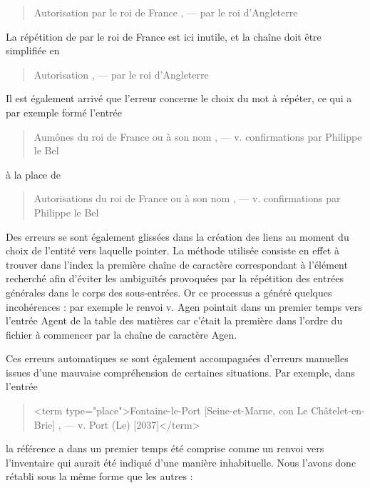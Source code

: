 \documentclass[a4paper,12pt,twoside]{book}
\begin{document}
	\begin{quotation}
		Autorisation par le roi de France , — par le roi d’Angleterre
	\end{quotation}
	
	\noindent La répétition de \og par le roi de France\fg{} est ici inutile, et la chaîne doit être simplifiée en
	
	\begin{quotation}
		Autorisation , — par le roi d’Angleterre
	\end{quotation}

	\noindent Il est également arrivé que l'erreur concerne le choix du mot à répéter, ce qui a par exemple formé l'entrée

	\begin{quotation}
		Aumônes du roi de France ou à son nom , — v. confirmations par Philippe le
	Bel
	\end{quotation}
	
	\noindent à la place de
	
	\begin{quotation}
		Autorisations du roi de France ou à son nom , — v. confirmations par Philippe le	Bel
	\end{quotation}

	Des erreurs se sont également glissées dans la création des liens au moment du choix de l'entité vers laquelle pointer. La méthode utilisée consiste en effet à trouver dans l'index la première chaîne de caractère correspondant à l'élément recherché afin d'éviter les ambiguïtés provoquées par la répétition des entrées générales dans le corps des sous-entrées. Or ce processus a généré quelques incohérences : par exemple le renvoi \og v. Agen\fg{} pointait dans un premier temps vers l'entrée \og Agent\fg{} de la table des matières car c'était la première dans l'ordre du fichier à commencer par la chaîne de caractère \og Agen\fg{}.
	
	Ces erreurs automatiques se sont également accompagnées d'erreurs manuelles issues d'une mauvaise compréhension de certaines situations. Par exemple, dans l'entrée
	
	\begin{quotation}
		<term type="place">Fontaine-le-Port [Seine-et-Marne, con Le Châtelet-en-Brie] , —
			v. Port (Le) [2037]</term>
	\end{quotation}
	
	\noindent la référence \fg{} a dans un premier temps été comprise comme un renvoi vers l'inventaire qui aurait été indiqué d'une manière inhabituelle. Nous l'avons donc rétabli sous la même forme que les autres :
	
\end{document}
